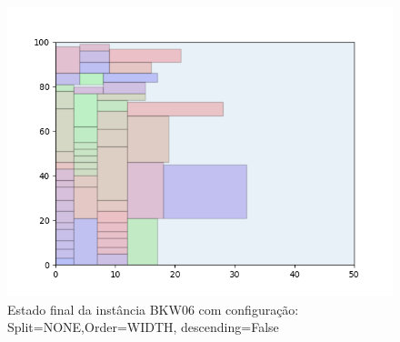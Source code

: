 \begin{figure}[H]
    \centering
    \caption[]{Estado final da instância BKW06 com configuração: Split=NONE,Order=WIDTH, descending=False}
    \label{fig:bkw06-none-width-false}
    \includegraphics[scale=0.5]{output/figures/bkw/bkw06/none/width/false/00}
\end{figure}